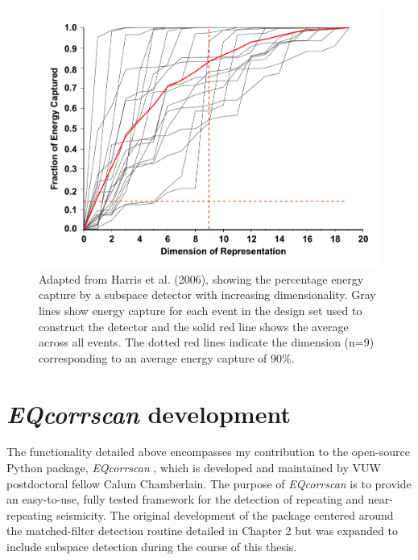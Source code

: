 \begin{figure}[h!]
\begin{center}
\includegraphics[width=0.70\columnwidth]{Appendices/EQcorrscan/figures/Harris_2006_fig8/Harris_2006_fig8}
\caption[Energy capture of subspace detectors with dimension]{{Adapted from Harris et al. (2006), showing the percentage energy capture
by a subspace detector with increasing dimensionality. Gray lines show
energy capture for each event in the design set used to construct the
detector and the solid red line shows the average across all events. The
dotted red lines indicate the dimension (n=9) corresponding to an
average energy capture of 90\%.
{\label{425783}}%
}}
\end{center}
\end{figure}

\section{\textit{EQcorrscan} development}
The functionality detailed above encompasses my contribution to the open-source Python package, \textit{EQcorrscan} \citep{Chamberlain_2017b}, which is developed and maintained by VUW postdoctoral fellow Calum Chamberlain. The purpose of \textit{EQcorrscan} is to provide an easy-to-use, fully tested framework for the detection of repeating and near-repeating seismicity. The original development of the package centered around the matched-filter detection routine detailed in Chapter 2 but was expanded to include subspace detection during the course of this thesis.